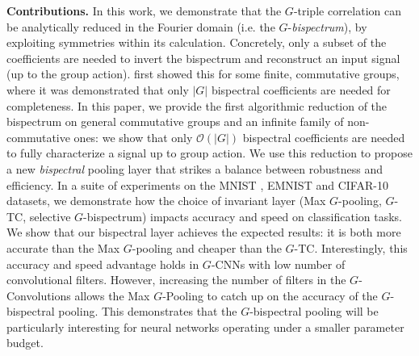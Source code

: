 \documentclass{article}
\theoremstyle{plain}
\theoremstyle{definition}
\theoremstyle{remark}
\begin{document}
\textbf{Contributions.} In this work, we demonstrate that the $G$-triple correlation can be analytically reduced in the Fourier domain (i.e. the $G$-\textit{bispectrum}), by exploiting symmetries within its calculation. Concretely, only a subset of the coefficients are needed to invert the bispectrum and reconstruct an input signal (up to the group action). \cite{giannakis1989signal, kakarala_thesis, sadler1992shift} first showed this for some finite, commutative groups, where it was demonstrated that only $|G|$ bispectral coefficients are needed for completeness. In this paper, we provide the first algorithmic reduction of the bispectrum on general commutative groups and an infinite family of non-commutative ones: we show that only $\mathcal{O}(|G|)$ bispectral coefficients are needed to fully characterize a signal up to group action. We use this reduction to propose a new \textit{bispectral} pooling layer that strikes a balance between robustness and efficiency. In a suite of experiments on the MNIST \cite{deng2012mnist}, EMNIST \cite{cohen2017emnist} and CIFAR-10 \cite{CIFAR10} datasets, we demonstrate how the choice of invariant layer (Max $G$-pooling, $G$-TC, selective $G$-bispectrum) impacts accuracy and speed on classification tasks. We show that our bispectral layer achieves the expected results: it is both more accurate than the Max $G$-pooling and cheaper than the $G$-TC. Interestingly, this accuracy and speed advantage holds in $G$-CNNs with low number of convolutional filters. However, increasing the number of filters in the $G$-Convolutions allows the Max $G$-Pooling to catch up on the accuracy of the $G$-bispectral pooling. This demonstrates that the $G$-bispectral pooling will be particularly interesting for neural networks operating under a smaller parameter budget.





\end{document}
